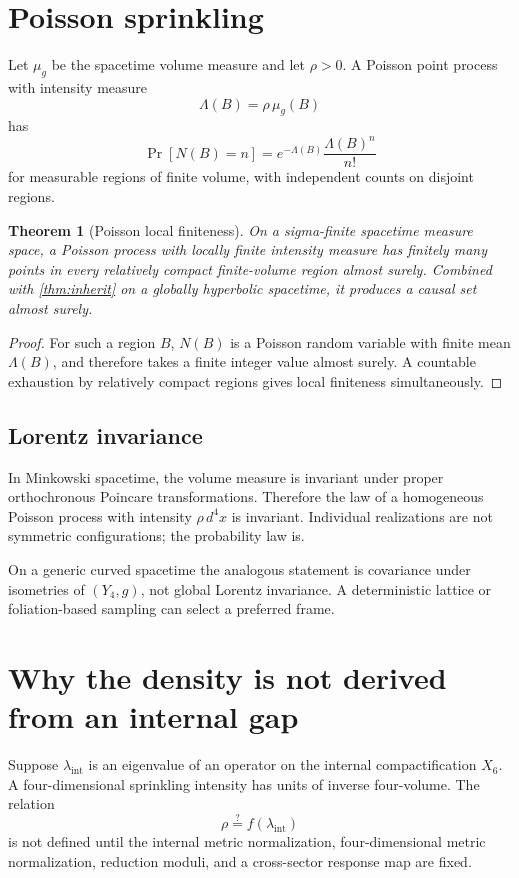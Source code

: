 \documentclass[11pt]{article}
\newtheorem{theorem}{Theorem}[section]
\theoremstyle{definition}
\theoremstyle{remark}
\begin{document}
\section{Poisson sprinkling}

Let \(\mu_g\) be the spacetime volume measure and let \(\rho>0\). A Poisson
point process with intensity measure
\[
 \Lambda(B)=\rho\,\mu_g(B)
\]
has
\[
 \Pr[N(B)=n]
 =
 e^{-\Lambda(B)}\frac{\Lambda(B)^n}{n!}
\]
for measurable regions of finite volume, with independent counts on
disjoint regions.

\begin{theorem}[Poisson local finiteness]
\label{thm:poisson}
On a sigma-finite spacetime measure space, a Poisson process with locally
finite intensity measure has finitely many points in every relatively
compact finite-volume region almost surely. Combined with
\autoref{thm:inherit} on a globally hyperbolic spacetime, it produces a
causal set almost surely.
\end{theorem}

\begin{proof}
For such a region \(B\), \(N(B)\) is a Poisson random variable with finite
mean \(\Lambda(B)\), and therefore takes a finite integer value almost
surely. A countable exhaustion by relatively compact regions gives local
finiteness simultaneously.
\end{proof}

\subsection{Lorentz invariance}

In Minkowski spacetime, the volume measure is invariant under proper
orthochronous Poincare transformations. Therefore the law of a homogeneous
Poisson process with intensity \(\rho\,d^4x\) is invariant. Individual
realizations are not symmetric configurations; the probability law is.

On a generic curved spacetime the analogous statement is covariance under
isometries of \((Y_4,g)\), not global Lorentz invariance. A deterministic
lattice or foliation-based sampling can select a preferred frame.

\section{Why the density is not derived from an internal gap}

Suppose \(\lambda_{\mathrm{int}}\) is an eigenvalue of an operator on the
internal compactification \(X_6\). A four-dimensional sprinkling intensity
has units of inverse four-volume. The relation
\[
 \rho\stackrel{?}{=}f(\lambda_{\mathrm{int}})
\]
is not defined until the internal metric normalization, four-dimensional
metric normalization, reduction moduli, and a cross-sector response map are
fixed.
\end{document}
